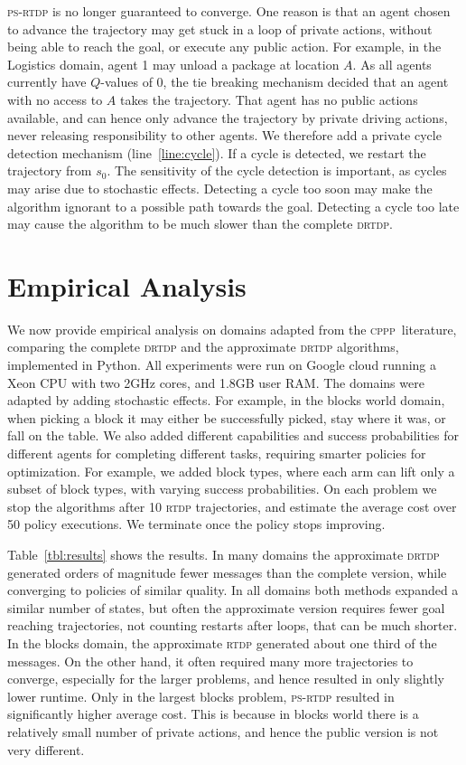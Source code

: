 \documentclass[letterpaper]{article} %
\newcommand{\cppp}{\textsc {cppp}\xspace}
\newcommand{\rtdp}{\textsc {rtdp}\xspace}
\newcommand{\drtdp}{\textsc {drtdp}\xspace}
\newcommand{\psrtdp}{\textsc{ps}-\textsc{rtdp}\xspace}
\theoremstyle{remark}
\begin{document}
\psrtdp is no longer guaranteed to converge. One reason is that an agent chosen to advance the trajectory may get stuck in a loop of private actions, without being able to reach the goal, or execute any public action. For example, in the Logistics domain, agent 1 may unload a package at location $A$. As all agents currently have  $Q$-values of 0, the tie breaking mechanism decided that an agent with no access to $A$ takes the trajectory. That agent has no public actions available, and can hence only advance the trajectory by private driving actions, never releasing responsibility to other agents.
We therefore add a private cycle detection mechanism (line~\ref{line:cycle}). If a cycle is detected, we restart the trajectory from $s_0$. The sensitivity of the cycle detection is important, as cycles may arise due to stochastic effects. Detecting a cycle too soon may make the algorithm ignorant to a possible path towards the goal. Detecting a cycle too late may cause the algorithm to be much slower than the complete \drtdp.


\vspace{-0.90mm}
\vspace{-1.59mm}
\section{Empirical Analysis}



We now provide empirical analysis on domains adapted from the \cppp\ literature, comparing the complete \drtdp and the approximate \drtdp algorithms, implemented in Python. All experiments were run on Google cloud running a Xeon CPU with two 2GHz cores, and 1.8GB user RAM.
The domains were adapted by adding stochastic effects. For example, in the blocks world domain, when picking a block it may either be successfully picked, stay where it was, or fall on the table. We also added different capabilities and success probabilities for different agents for completing different tasks, requiring smarter policies for optimization. For example, we added block types, where each arm can lift only a subset of block types, with varying success probabilities.  On each problem we stop the algorithms after 10 \rtdp trajectories, and estimate the average cost over 50 policy executions. We terminate once the policy stops improving.

Table~\ref{tbl:results} shows the results. In many domains the approximate \drtdp generated orders of magnitude fewer messages than the complete version, while converging to policies of similar quality. In all domains both methods expanded a similar number of states, but often the approximate version requires fewer goal reaching trajectories, not counting restarts after loops, that can be much shorter.  In the blocks domain, the approximate \rtdp generated about one third of the messages. On the other hand, it often required many more trajectories to converge, especially for the larger problems, and hence resulted in only slightly lower runtime. Only in the largest blocks problem, \psrtdp resulted in significantly higher average cost. This is because in blocks world there is a relatively small number of private actions, and hence the public version is not very different.
\end{document}
